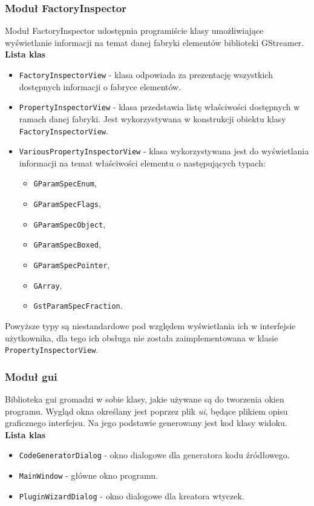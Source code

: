 \documentclass[12pt]{article}
\begin{document}
\subsubsection{Moduł FactoryInspector}
Moduł FactoryInspector udostępnia programiście klasy umożliwiające wyświetlanie informacji na temat danej fabryki elementów biblioteki GStreamer. \\
\textbf{Lista klas}
\begin{itemize}
  \setlength{\itemsep}{0em}
\item \texttt{FactoryInspectorView} - klasa odpowiada za prezentację wszystkich dostępnych informacji o fabryce elementów. 
\item \texttt{PropertyInspectorView} - klasa przedstawia listę właściwości dostępnych w ramach danej fabryki. Jest wykorzystywana w konstrukcji obiektu klasy \texttt{FactoryInspectorView}.
\item \texttt{VariousPropertyInspectorView} - klasa wykorzystywana jest do wyświetlania informacji na temat właściwości elementu o następujących typach:
  \begin{itemize}
    \setlength{\itemsep}{0em}
  \item \texttt{GParamSpecEnum},
  \item \texttt{GParamSpecFlags},
  \item \texttt{GParamSpecObject},
  \item \texttt{GParamSpecBoxed},
  \item \texttt{GParamSpecPointer},
  \item \texttt{GArray},
  \item \texttt{GstParamSpecFraction}.
  \end{itemize}
\end{itemize}
Powyższe typy są niestandardowe pod względem wyświetlania ich w interfejsie użytkownika, dla tego ich obsługa nie została zaimplementowana w klasie \texttt{PropertyInspectorView}.
\subsubsection{Moduł gui}
Biblioteka gui gromadzi w sobie klasy, jakie używane są do tworzenia okien programu. Wygląd okna określany jest poprzez plik \textit{ui}, będące plikiem opisu graficznego interfejsu. Na jego podstawie generowany jest kod klasy widoku. \\
\textbf{Lista klas}
\begin{itemize}
  \setlength{\itemsep}{0em}
\item \texttt{CodeGeneratorDialog} - okno dialogowe dla generatora kodu źródłowego.
\item \texttt{MainWindow} - główne okno programu.
\item \texttt{PluginWizardDialog} - okno dialogowe dla kreatora wtyczek.
\end{itemize}
\end{document}
